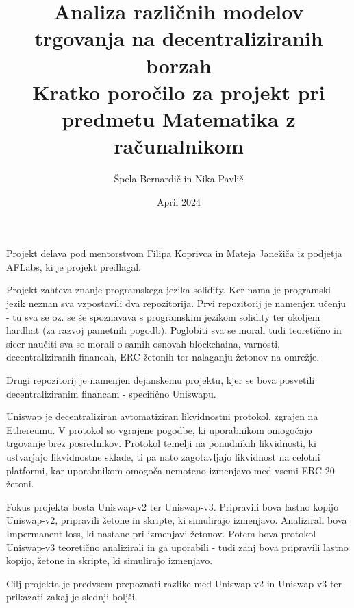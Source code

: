 \documentclass[a4paper,12pt]{article}%
\title{Analiza različnih modelov trgovanja na decentraliziranih borzah \\ \large Kratko poročilo za projekt pri predmetu Matematika z računalnikom}
\date{April 2024}
\author{Špela Bernardič in Nika Pavlič}
\begin{document}
\maketitle

Projekt delava pod mentorstvom Filipa Koprivca in Mateja Janežiča iz podjetja AFLabs, ki je projekt predlagal.

Projekt zahteva znanje programskega jezika solidity. Ker nama je programski jezik neznan sva vzpostavili dva repozitorija.
Prvi repozitorij je namenjen učenju - tu sva se oz. se še spoznavava s programskim jezikom solidity ter okoljem hardhat (za razvoj pametnih pogodb). Poglobiti sva se morali tudi teoretično in sicer naučiti sva se morali o samih osnovah blockchaina, varnosti, decentraliziranih financah, ERC žetonih ter nalaganju žetonov na omrežje.


Drugi repozitorij je namenjen dejanskemu projektu, kjer se bova posvetili decentraliziranim financam - specifično Uniswapu.

Uniswap je decentraliziran avtomatiziran likvidnostni protokol, zgrajen na Ethereumu. V protokol so vgrajene pogodbe, ki uporabnikom omogočajo trgovanje brez posrednikov. Protokol temelji na ponudnikih likvidnosti, ki ustvarjajo likvidnostne sklade, ti pa nato zagotavljajo likvidnost na celotni platformi, kar uporabnikom omogoča nemoteno izmenjavo med vsemi ERC-20 žetoni. 

Fokus projekta bosta Uniswap-v2 ter Uniswap-v3. Pripravili bova lastno kopijo Uniswap-v2, pripravili žetone in skripte, ki simulirajo izmenjavo. Analizirali bova Impermanent loss, ki nastane pri izmenjavi žetonov. Potem bova protokol Uniswap-v3 teoretično analizirali in ga uporabili - tudi zanj bova pripravili lastno kopijo, žetone in skripte, ki simulirajo izmenjavo. 

Cilj projekta je predvsem prepoznati razlike med Uniswap-v2 in Uniswap-v3 ter prikazati zakaj je slednji boljši. 
\end{document}
